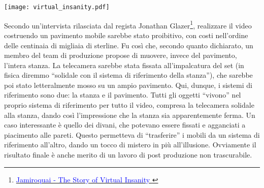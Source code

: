 \begin{marginfigure}
    \centering
    \texttt{[image: virtual\_insanity.pdf]}
    \caption{Schema semplificato del set realizzato per il video musicale:
    (1) telecamera fissata alla stanza mobile, (2) Jay Kay che si diverte,
    (3) stanza mobile, (4) pavimento del set.}
\end{marginfigure}


Secondo un'intervista rilasciata dal regista Jonathan Glazer\footnote{\href{https://www.youtube.com/watch?v=nY6YwZzKzTI}{\textcolor{blue}{Jamiroquai - The Story of Virtual Insanity
}}}, realizzare il video costruendo un pavimento mobile sarebbe
stato proibitivo, con costi nell'ordine delle centinaia di migliaia
di sterline. Fu così che, secondo quanto dichiarato, un membro del team di produzione
propose di muovere, invece del pavimento, l'intera stanza.
La telecamera sarebbe stata fissata all'impalcatura del set
(in fisica diremmo ``solidale con il sistema di riferimento
della stanza''), che sarebbe poi stato letteralmente mosso
su un ampio pavimento.
Qui, dunque, i sistemi di riferimento sono due: la stanza e il
pavimento. Tutti gli oggetti ``vivono'' nel proprio sistema
di riferimento per tutto il video, compresa la telecamera solidale
alla stanza, dando così l'impressione che
la stanza sia apparentemente ferma. Un caso interessante è
quello dei divani, che potevano essere fissati e agganciati
a piacimento alle pareti. Questo permetteva di ``trasferire''
i mobili da un sistema di riferimento all'altro, dando un
tocco di mistero in più all'illusione. Ovviamente il risultato finale
è anche merito di un lavoro di post produzione non trascurabile.




